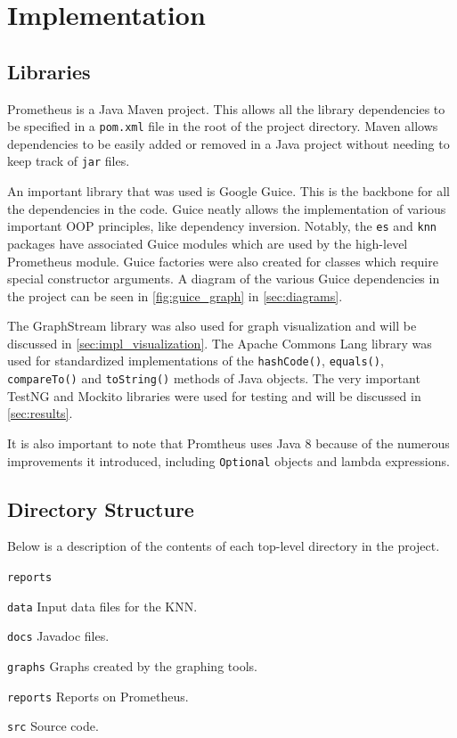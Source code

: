 \documentclass[titlepage,11pt]{article}
\newcommand{\code}[1]{\texttt{#1}}
\begin{document}
\section{Implementation}
\label{sec:implementation}

\subsection{Libraries}
Prometheus is a Java Maven project. This allows all the library dependencies to be specified in a \code{pom.xml} file in the root of the project directory. Maven allows dependencies to be easily added or removed in a Java project without needing to keep track of \code{jar} files.

An important library that was used is Google Guice. This is the backbone for all the dependencies in the code. Guice neatly allows the implementation of various important OOP principles, like dependency inversion. Notably, the \code{es} and \code{knn} packages have associated Guice modules which are used by the high-level Prometheus module. Guice factories were also created for classes which require special constructor arguments. A diagram of the various Guice dependencies in the project can be seen in \cref{fig:guice_graph} in \cref{sec:diagrams}.

The GraphStream library was also used for graph visualization and will be discussed in \cref{sec:impl_visualization}. The Apache Commons Lang library was used for standardized implementations of the \code{hashCode()}, \code{equals()}, \code{compareTo()} and \code{toString()} methods of Java objects. The very important TestNG and Mockito libraries were used for testing and will be discussed in \cref{sec:results}.

It is also important to note that Promtheus uses Java 8 because of the numerous improvements it introduced, including \code{Optional} objects and lambda expressions.

\subsection{Directory Structure}
Below is a description of the contents of each top-level directory in the project.

\begin{labeling}{\code{reports}}
	\item[\code{data}] Input data files for the KNN.
	\item[\code{docs}] Javadoc files.
	\item[\code{graphs}] Graphs created by the graphing tools.
	\item[\code{reports}] Reports on Prometheus.
	\item[\code{src}] Source code.
\end{labeling}
\end{document}
